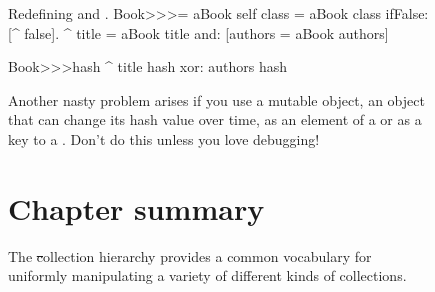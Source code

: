\documentclass[a4paper,10pt,twoside]{book}
\begin{document}
\begin{figure}
\begin{center}
\begin{method}{Redefining \lct{=} and .}
Book>>>= aBook
   self class = aBook class ifFalse: [^ false].
   ^ title = aBook title and: [authors = aBook authors]

Book>>>hash 
   ^ title hash xor: authors hash
\end{method}

Another nasty problem arises if you use a mutable object, \ie an object that can change its hash value over time, as an element of a  or as a key to a .
Don't do this unless you love debugging!

\section{Chapter summary}

The \st collection hierarchy provides a common vocabulary for uniformly manipulating a variety of different kinds of collections.


\end{center}
\end{figure}
\end{document}
